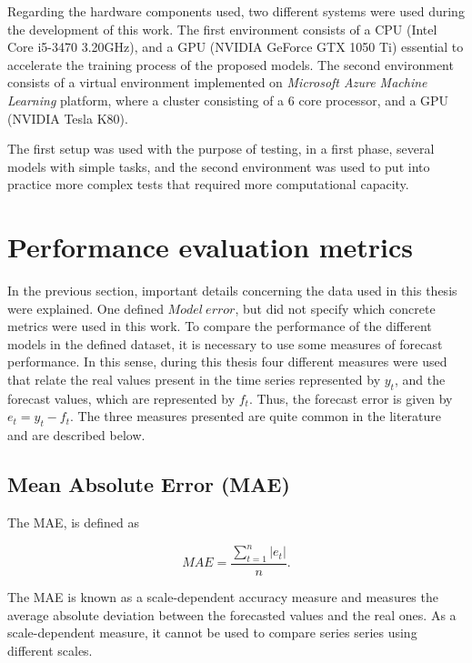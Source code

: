 Regarding the hardware components used, two different systems were used during the development of this work. The first environment consists of a CPU (Intel Core i5-3470 3.20GHz), and a GPU (NVIDIA GeForce GTX 1050 Ti) essential to accelerate the training process of the proposed models. The second environment consists of a virtual environment implemented on \textit{Microsoft Azure Machine Learning} platform, where a cluster consisting of a 6 core processor, and a GPU (NVIDIA Tesla K80).

The first setup was used with the purpose of testing, in a first phase, several models with simple tasks, and the second environment was used to put into practice more complex tests that required more computational capacity.
	
\section{Performance evaluation metrics}\label{chap3:sec:performance_evaluation_metrics}

In the previous section, important details concerning the data used in this thesis were explained. One defined $Model\ error$, but did not specify which concrete metrics were used in this work. To compare the performance of the different models in the defined dataset, it is necessary to use some measures of forecast performance. In this sense, during this thesis four different measures were used that relate the real values present in the time series represented by $y_t$, and the forecast values, which are represented by $f_t$. Thus, the forecast error is given by $e_t=y_t-f_t$. The three measures presented are quite common in the literature \cite{errors} and are described below.

\subsection{Mean Absolute Error (MAE)}

The \ac{MAE}, is defined as

\begin{equation}
     MAE =\frac {\sum_{t=1}^n|e_t|}{n}.
\label{mae}
\end{equation}

The \ac{MAE} is known as a scale-dependent accuracy measure and measures the average absolute deviation between the forecasted values and the real ones. As a scale-dependent measure, it cannot be used to compare series series using different scales.


